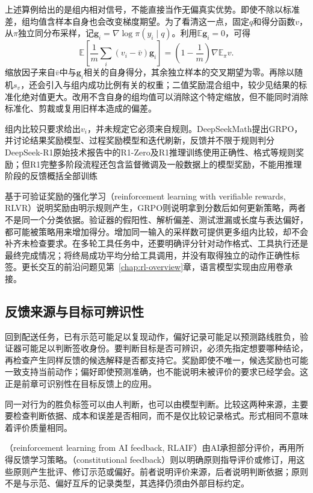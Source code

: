 上述算例给出的是组内相对信号，不能直接当作无偏真实优势。即使不除以标准差，组均值含样本自身也会改变梯度期望。为了看清这一点，固定$q$和得分函数$v$，从$\pi$独立同分布采样，记$\bm g_i=\nabla\log\pi(y_i\mid q)$。利用$\mathbb E\bm g_i=0$，可得
\[
  \mathbb E\left[\frac1m\sum_i(v_i-\bar v)\bm g_i\right]
  =\left(1-\frac1m\right)\nabla\mathbb E_\pi v.
\]
缩放因子来自$\bar v$中与$\bm g_i$相关的自身得分，其余独立样本的交叉期望为零。再除以随机$s_v$，还会引入与组内成功比例有关的权重；二值奖励混合组中，较少见结果的标准化绝对值更大。改用不含自身的组均值可以消除这个特定缩放，但不能同时消除标准化、剪裁或复用旧样本造成的偏差。

组内比较只要求给出$v_i$，并未规定它必须来自规则。DeepSeekMath提出GRPO，并讨论结果奖励模型、过程奖励模型和迭代刷新，反馈并不限于规则判分
DeepSeek-R1原始技术报告中的R1-Zero及R1推理训练使用正确性、格式等规则奖励；但R1完整多阶段流程还包含监督微调及一般数据上的模型奖励，不能用推理阶段的反馈概括全部训练

基于可验证奖励的强化学习（reinforcement learning with verifiable rewards, RLVR）说明奖励由明示规则产生，GRPO则说明拿到分数后如何更新策略，两者不是同一个分类依据。验证器的假阳性、解析偏差、测试泄漏或长度与表达偏好，都可能被策略用来增加得分。增加同一输入的采样数可提供更多组内比较，却不会补齐未检查要求。在多轮工具任务中，还要明确评分针对动作格式、工具执行还是最终完成情况；将终局成功平均分给工具调用，并没有取得独立的动作正确性标签。更长交互的前沿问题见第~\ref{chap:rl-overview}章，语言模型实现由应用卷承接。

\subsection{反馈来源与目标可辨识性}
\label{sec:rl-reward-sources}

回到配送任务，已有示范可能足以复现动作，偏好记录可能足以预测路线胜负，验证器可能足以判断签收身份。要判断目标是否可辨识，必须先指定想要哪种结论，再检查产生同样反馈的候选解释是否都支持它。奖励即使不唯一，候选奖励也可能一致支持当前动作；偏好即使预测准确，也不能说明未被评价的要求已经学会。这正是前章可识别性在目标反馈上的应用。

同一对行为的胜负标签可以由人判断，也可以由模型判断。比较这两种来源，主要要检查判断依据、成本和误差是否相同，而不是仅比较记录格式。形式相同不意味着评价质量相同。

（reinforcement learning from AI feedback, RLAIF）由AI承担部分评价，再用所得反馈学习策略。（constitutional feedback）则以明确原则指导评价或修订，用这些原则产生批评、修订示范或偏好。前者说明评价来源，后者说明判断依据；原则不是与示范、偏好互斥的记录类型，其选择仍须由外部目标约定。


